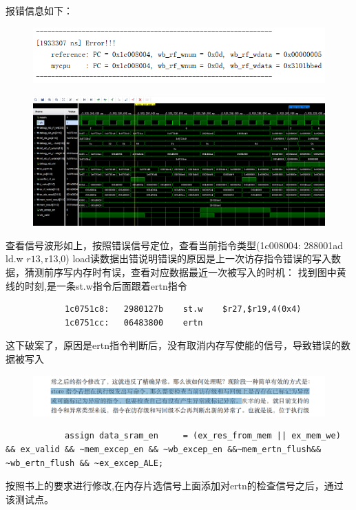 \documentclass[11pt]{article}
\begin{document}
          报错信息如下：
          \begin{figure}[H]
              \centering
              \includegraphics[width=15cm]{fig/16.png}
            \end{figure}
            \begin{figure}[H]
              \centering
              \includegraphics[width=15cm]{fig/17.png}
            \end{figure}
          查看信号波形如上，按照错误信号定位，查看当前指令类型(1c008004:	288001ad 	ld.w	$r13,$r13,0)
          load读数据出错说明错误的原因是上一次访存指令错误的写入数据，猜测前序写内存时有误，查看对应数据最近一次被写入的时机：
          找到图中黄线的时刻,是一条st.w指令后面跟着ertn指令
          \begin{lstlisting}
            1c0751c8:	2980127b 	st.w	$r27,$r19,4(0x4)
            1c0751cc:	06483800 	ertn
          \end{lstlisting}
          这下破案了，原因是ertn指令判断后，没有取消内存写使能的信号，导致错误的数据被写入
          \begin{figure}[H]
            \centering
            \includegraphics[width=15cm]{fig/18.png}
          \end{figure}
          \begin{lstlisting}
            assign data_sram_en     = (ex_res_from_mem || ex_mem_we) && ex_valid && ~mem_excep_en && ~wb_excep_en &&~mem_ertn_flush&& ~wb_ertn_flush && ~ex_excep_ALE;
          \end{lstlisting}
          按照书上的要求进行修改,在内存片选信号上面添加对ertn的检查信号之后，通过该测试点。
\end{document}
